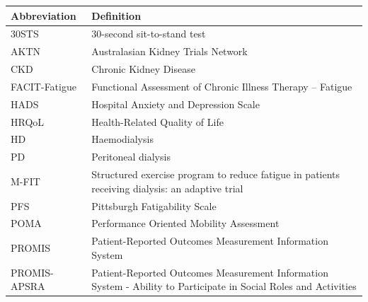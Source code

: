\documentclass[11pt,parskip=half-]{scrartcl}
\renewcommand{\arraystretch}{1}
\begin{document}
\begin{table}[H]
  \renewcommand{\arraystretch}{1.5}
  \centering
  \begin{tabular}{p{}p{}}
    \toprule
    Abbreviation  & Definition                                                                                                       \\
    \midrule
    30STS         & 30-second sit-to-stand test                                                                                      \\
    AKTN          & Australasian Kidney Trials Network                                                                               \\
    CKD           & Chronic Kidney Disease                                                                                           \\
    FACIT-Fatigue & Functional Assessment of Chronic Illness Therapy – Fatigue                                                       \\
    HADS          & Hospital Anxiety and Depression Scale                                                                            \\
    HRQoL         & Health-Related Quality of Life                                                                                   \\
    HD            & Haemodialysis                                                                                                    \\
    PD            & Peritoneal dialysis                                                                                              \\
    M-FIT         & Structured exercise program to reduce fatigue in patients receiving dialysis: an adaptive trial                  \\
    PFS           & Pittsburgh Fatigability Scale                                                                                    \\
    POMA          & Performance Oriented Mobility Assessment                                                                         \\
    PROMIS        & Patient-Reported Outcomes Measurement Information System                                                         \\
    PROMIS-APSRA  & Patient-Reported Outcomes Measurement Information System - Ability to Participate in Social Roles and Activities \\

\end{tabular}
\end{table}
\end{document}
